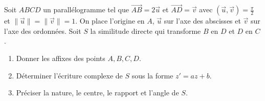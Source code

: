\documentclass[11pt]{article}
\begin{document}
\begin{exercice}
Soit $ABCD$ un parallélogramme tel que $\overrightarrow{AB} = 2\vec{u}$ et $\overrightarrow{AD} = \vec{v}$ avec $(\vec{u}, \vec{v}) = \frac{\pi}{2}$ et $\|\vec{u}\| = \|\vec{v}\| = 1$.
On place l'origine en $A$, $\vec{u}$ sur l'axe des abscisses et $\vec{v}$ sur l'axe des ordonnées.
Soit $S$ la similitude directe qui transforme $B$ en $D$ et $D$ en $C$.
\begin{enumerate}
    \item Donner les affixes des points $A, B, C, D$.
    \item Déterminer l'écriture complexe de $S$ sous la forme $z' = a z + b$.
    \item Préciser la nature, le centre, le rapport et l'angle de $S$.
\end{enumerate}
\end{exercice}
\end{document}
